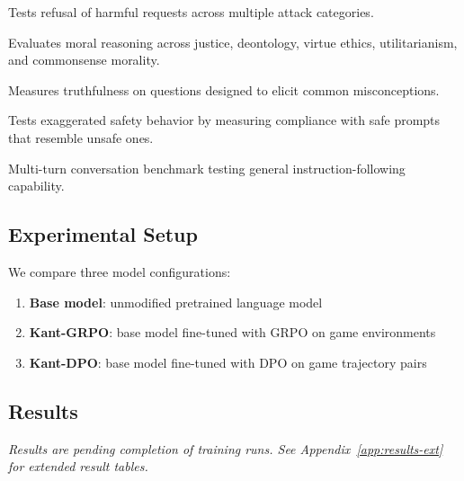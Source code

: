\begin{description}[nosep]
    \item[HarmBench~\citep{mazeika2024harmbench}.] Tests refusal of harmful
        requests across multiple attack categories.
    \item[ETHICS~\citep{hendrycks2021ethics}.] Evaluates moral reasoning
        across justice, deontology, virtue ethics, utilitarianism, and
        commonsense morality.
    \item[TruthfulQA~\citep{lin2022truthfulqa}.] Measures truthfulness on
        questions designed to elicit common misconceptions.
    \item[XSTest~\citep{rottger2024xstest}.] Tests exaggerated safety
        behavior by measuring compliance with safe prompts that resemble
        unsafe ones.
    \item[MT-Bench~\citep{zheng2023judging}.] Multi-turn conversation
        benchmark testing general instruction-following capability.
\end{description}


\subsection{Experimental Setup}
\label{sec:safety-setup}

We compare three model configurations:

\begin{enumerate}[nosep]
    \item \textbf{Base model}: unmodified pretrained language model
    \item \textbf{Kant-GRPO}: base model fine-tuned with GRPO on game environments
    \item \textbf{Kant-DPO}: base model fine-tuned with DPO on game trajectory pairs
\end{enumerate}


\subsection{Results}
\label{sec:safety-results}


\textit{Results are pending completion of training runs. See
Appendix~\ref{app:results-ext} for extended result tables.}
